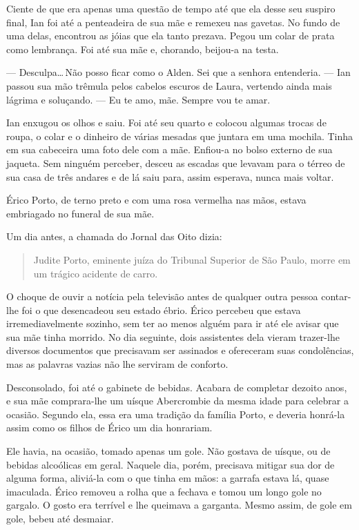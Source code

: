 Ciente de que era apenas uma questão de tempo até que ela desse seu
suspiro final, Ian foi até a penteadeira de sua mãe e remexeu nas
gavetas. No fundo de uma delas, encontrou as jóias que ela tanto
prezava. Pegou um colar de prata como lembrança. Foi até sua mãe e,
chorando, beijou-a na testa.

--- Desculpa\ldots\,Não posso ficar como o Alden. Sei que a senhora
entenderia. --- Ian passou sua mão trêmula pelos cabelos escuros de Laura,
vertendo ainda mais lágrima e soluçando. --- Eu te amo, mãe. Sempre vou te
amar.

Ian enxugou os olhos e saiu. Foi até seu quarto e colocou algumas trocas
de roupa, o colar e o dinheiro de várias mesadas que juntara em uma
mochila. Tinha em sua cabeceira uma foto dele com a mãe. Enfiou-a no
bolso externo de sua jaqueta. Sem ninguém perceber, desceu as escadas
que levavam para o térreo de sua casa de três andares e de lá saiu para,
assim esperava, nunca mais voltar.

\espaco
{}

Érico Porto, de terno preto e com uma rosa vermelha nas mãos, estava
embriagado no funeral de sua mãe.

Um dia antes, a chamada do Jornal das Oito dizia:

  \begin{quote}
  Judite Porto, eminente juíza do Tribunal Superior de São Paulo, morre
  em um trágico acidente de carro.
  \end{quote}

O choque de ouvir a notícia pela televisão antes de qualquer outra
pessoa contar-lhe foi o que desencadeou seu estado ébrio. Érico percebeu
que estava irremediavelmente sozinho, sem ter ao menos alguém para ir
até ele avisar que sua mãe tinha morrido. No dia seguinte, dois
assistentes dela vieram trazer-lhe diversos documentos que precisavam
ser assinados e ofereceram suas condolências, mas as palavras vazias não
lhe serviram de conforto.

Desconsolado, foi até o gabinete de bebidas. Acabara de completar
dezoito anos, e sua mãe comprara-lhe um uísque Abercrombie da mesma
idade para celebrar a ocasião. Segundo ela, essa era uma tradição da
família Porto, e deveria honrá-la assim como os filhos de Érico um dia
honrariam.

Ele havia, na ocasião, tomado apenas um gole. Não gostava de uísque, ou
de bebidas alcoólicas em geral. Naquele dia, porém, precisava mitigar
sua dor de alguma forma, aliviá-la com o que tinha em mãos: a garrafa
estava lá, quase imaculada. Érico removeu a rolha que a fechava e tomou
um longo gole no gargalo. O gosto era terrível e lhe queimava a
garganta. Mesmo assim, de gole em gole, bebeu até desmaiar.

